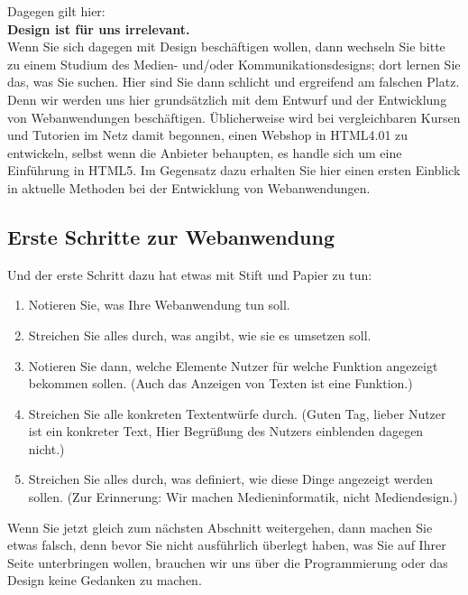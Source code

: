 Dagegen gilt hier:\\

\textbf{Design ist für uns irrelevant.}\\

Wenn Sie sich dagegen mit Design beschäftigen wollen, dann wechseln Sie bitte zu einem Studium des Medien- und/oder Kommunikationsdesigns; dort lernen Sie das, was Sie suchen. Hier sind Sie dann schlicht und ergreifend am falschen Platz.\\

Denn wir werden uns hier grundsätzlich mit dem Entwurf und der Entwicklung von Webanwendungen beschäftigen. Üblicherweise wird bei vergleichbaren Kursen und Tutorien im Netz damit begonnen, einen Webshop in HTML4.01 zu entwickeln, selbst wenn die Anbieter behaupten, es handle sich um eine Einführung in HTML5. Im Gegensatz dazu erhalten Sie hier einen ersten Einblick in aktuelle Methoden bei der Entwicklung von Webanwendungen.

\subsection{Erste Schritte zur Webanwendung}

Und der erste Schritt dazu hat etwas mit Stift und Papier zu tun: 

\begin{enumerate}
	\item Notieren Sie, was Ihre Webanwendung tun soll.
	\item Streichen Sie alles durch, was angibt, wie sie es umsetzen soll.
	\item Notieren Sie dann, welche Elemente Nutzer für welche Funktion angezeigt bekommen sollen. (Auch das Anzeigen von Texten ist eine Funktion.)
	\item Streichen Sie alle konkreten Textentwürfe durch. (\glqq{}Guten Tag, lieber Nutzer\grqq{} ist ein konkreter Text, \glqq{}Hier Begrüßung des Nutzers einblenden\grqq{} dagegen nicht.)
	\item Streichen Sie alles durch, was definiert, wie diese Dinge angezeigt werden sollen. (Zur Erinnerung: Wir machen Medieninformatik, nicht Mediendesign.)
\end{enumerate}

Wenn Sie jetzt gleich zum nächsten Abschnitt weitergehen, dann machen Sie etwas falsch, denn bevor Sie nicht ausführlich überlegt haben, was Sie auf Ihrer Seite unterbringen wollen, brauchen wir uns über die Programmierung oder das Design keine Gedanken zu machen.\\

